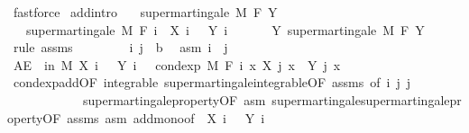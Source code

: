 \begin{isabellebody}
\ fastforce%
\endisatagproof
{\isafoldproof}%
%
\isadelimproof
\isanewline
%
\endisadelimproof
\isanewline
{}\isamarkupfalse%
\ add{\isacharbrackleft}{\kern0pt}intro{\isacharbrackright}{\kern0pt}{\isacharcolon}{\kern0pt}\isanewline
\ \ \ {\isachardoublequoteopen}supermartingale\ M\ F\ Y{\isachardoublequoteclose}\isanewline
\ \ \ {\isachardoublequoteopen}supermartingale\ M\ F\ {\isacharparenleft}{\kern0pt}{\isasymlambda}i\ {\isasymxi}{\isachardot}{\kern0pt}\ X\ i\ {\isasymxi}\ {\isacharplus}{\kern0pt}\ Y\ i\ {\isasymxi}{\isacharparenright}{\kern0pt}{\isachardoublequoteclose}\isanewline
%
\isadelimproof
%
\endisadelimproof
%
\isatagproof
{}\isamarkupfalse%
\ {\isacharminus}{\kern0pt}\isanewline
\ \ \isamarkupfalse%
\ Y{\isacharcolon}{\kern0pt}\ supermartingale\ M\ F\ Y\ \isamarkupfalse%
\ {\isacharparenleft}{\kern0pt}rule\ assms{\isacharparenright}{\kern0pt}\isanewline
\ \ \isacommand{{\isacharbraceleft}{\kern0pt}}\isamarkupfalse%
\isanewline
\ \ \ \ \isamarkupfalse%
\ i\ j\ {\isacharcolon}{\kern0pt}{\isacharcolon}{\kern0pt}\ {\isacharprime}{\kern0pt}b\ \isamarkupfalse%
\ asm{\isacharcolon}{\kern0pt}\ {\isachardoublequoteopen}i\ {\isasymle}\ j{\isachardoublequoteclose}\isanewline
\ \ \ \ \isamarkupfalse%
\ {\isachardoublequoteopen}AE\ {\isasymxi}\ in\ M{\isachardot}{\kern0pt}\ X\ i\ {\isasymxi}\ {\isacharplus}{\kern0pt}\ Y\ i\ {\isasymxi}\ {\isasymge}\ cond{\isacharunderscore}{\kern0pt}exp\ M\ {\isacharparenleft}{\kern0pt}F\ i{\isacharparenright}{\kern0pt}\ {\isacharparenleft}{\kern0pt}{\isasymlambda}x{\isachardot}{\kern0pt}\ X\ j\ x\ {\isacharplus}{\kern0pt}\ Y\ j\ x{\isacharparenright}{\kern0pt}\ {\isasymxi}{\isachardoublequoteclose}\ \isanewline
\ \ \ \ \ \ \isamarkupfalse%
\ cond{\isacharunderscore}{\kern0pt}exp{\isacharunderscore}{\kern0pt}add{\isacharbrackleft}{\kern0pt}OF\ integrable\ supermartingale{\isachardot}{\kern0pt}integrable{\isacharbrackleft}{\kern0pt}OF\ assms{\isacharbrackright}{\kern0pt}{\isacharcomma}{\kern0pt}\ of\ i\ j\ j{\isacharbrackright}{\kern0pt}\ \isanewline
\ \ \ \ \ \ \ \ \ \ \ \ supermartingale{\isacharunderscore}{\kern0pt}property{\isacharbrackleft}{\kern0pt}OF\ asm{\isacharbrackright}{\kern0pt}\ supermartingale{\isachardot}{\kern0pt}supermartingale{\isacharunderscore}{\kern0pt}property{\isacharbrackleft}{\kern0pt}OF\ assms\ asm{\isacharbrackright}{\kern0pt}\ add{\isacharunderscore}{\kern0pt}mono{\isacharbrackleft}{\kern0pt}of\ {\isacharunderscore}{\kern0pt}\ {\isachardoublequoteopen}X\ i\ {\isacharunderscore}{\kern0pt}{\isachardoublequoteclose}\ {\isacharunderscore}{\kern0pt}\ {\isachardoublequoteopen}Y\ i\ {\isacharunderscore}{\kern0pt}{\isachardoublequoteclose}{\isacharbrackright}{\kern0pt}\ \isamarkupfalse%

\end{isabellebody}
